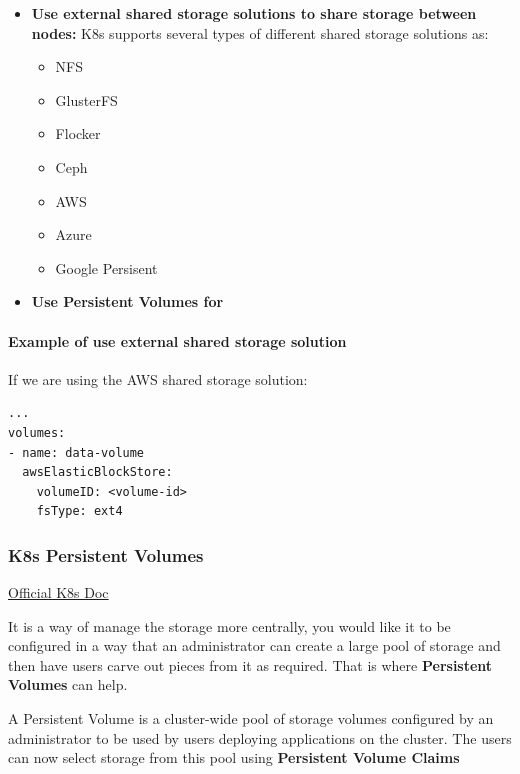 \documentclass{article}
\newenvironment{codetemplate}[1][]{%
  \mybasecolorbox[#1]
  \itshape
}{%
  \endmybasecolorbox
}
\begin{document}
\begin{itemize}
    \item \textbf{Use external shared storage solutions to share storage between nodes:} K8s supports several types of different shared storage solutions as:
    \begin{itemize}
        \item NFS
        \item GlusterFS
        \item Flocker
        \item Ceph
        \item AWS
        \item Azure
        \item Google Persisent
    \end{itemize}

    \item \textbf{Use Persistent Volumes for }
\end{itemize}

\paragraph{Example of use external shared storage solution}

If we are using the AWS shared storage solution:
\begin{codetemplate}{}
\begin{verbatim}
...
volumes:
- name: data-volume
  awsElasticBlockStore:
    volumeID: <volume-id>
    fsType: ext4
\end{verbatim}
\end{codetemplate}

\subsubsection{K8s Persistent Volumes}

\href{https://kubernetes.io/docs/concepts/storage/persistent-volumes/}{Official K8s Doc}

It is a way of manage the storage more centrally, you would like it to be configured in a way that an administrator can create a large pool of storage and then have users carve out pieces from it as required. That is where \textbf{Persistent Volumes} can help.

A Persistent Volume is a cluster-wide pool of storage volumes configured by an administrator to be used by users deploying applications on the cluster. The users can now select storage from this pool using \textbf{Persistent Volume Claims}
\end{document}
